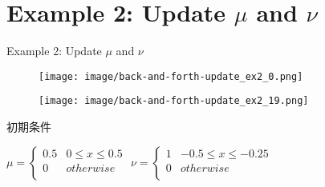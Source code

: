 \documentclass[aspectratio=169, dvipdfmx, 12pt]{beamer}
\begin{document}
\section{Example 2: Update $\mu$ and $\nu$}
\begin{frame}{Example 2: Update $\mu$ and $\nu$}
    \begin{figure}[htb]
        \begin{center}
            \begin{minipage}{0.45\hsize}
                \texttt{[image: image/back-and-forth-update\_ex2\_0.png]}
            \end{minipage}
            \begin{minipage}{0.45\hsize}
                \texttt{[image: image/back-and-forth-update\_ex2\_19.png]}
            \end{minipage}
        \end{center}
    \end{figure}
    \label{Example 2}

    初期条件
    \begin{center}
    $\mu = \left\{
        \begin{array}{ll}
            0.5 & 0 \le x \le 0.5 \\
            0 & otherwise \\
        \end{array}
    \right.
    $
    $\nu = \left\{
        \begin{array}{ll}
            1 & - 0.5 \le x \le - 0.25 \\
            0 & otherwise \\
        \end{array}
    \right.
    $
    \end{center}

\end{frame}
\end{document}
